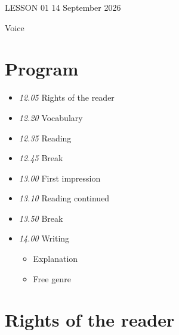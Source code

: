 \documentclass[11pt,a4paper,oneside]{book}
\begin{document}
\clearpage{}
{\color{blue}\small LESSON 01 \hfill 14 September 2026\par}
\vspace{4mm}
{\displayfont\color{navy}\fontsize{30}{34}\selectfont Voice\par}\vspace{4mm}

\section*{Program}

\begin{itemize}
\item \emph{12.05} Rights of the reader
\item \emph{12.20} Vocabulary
\item \emph{12.35} Reading
\item \emph{12.45} Break
\item \emph{13.00} First impression
\item \emph{13.10} Reading continued
\item \emph{13.50} Break
\item \emph{14.00} Writing

\begin{itemize}
\item Explanation
\item Free genre
\end{itemize}

\end{itemize}

\section*{Rights of the reader}
\end{document}
